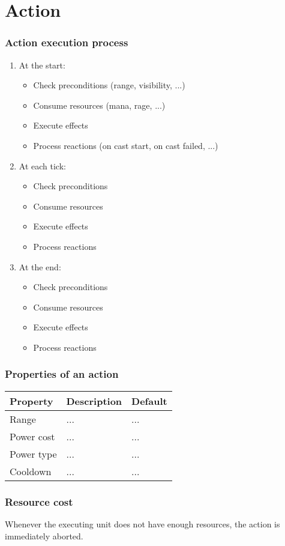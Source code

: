 \chapter{Action}

\subsection{Action execution process}

\begin{enumerate}
	\item At the start:
	\begin{itemize}
		\item Check preconditions (range, visibility, ...)
		\item Consume resources (mana, rage, ...)
		\item Execute effects
		\item Process reactions (on cast start, on cast failed, ...)
    	\end{itemize}
	\item  At each tick:
	\begin{itemize}
		\item Check preconditions
		\item Consume resources
		\item Execute effects
		\item Process reactions 
    	\end{itemize}
	\item At the end:
	\begin{itemize}
		\item Check preconditions
		\item Consume resources
		\item Execute effects
		\item Process reactions 
    	\end{itemize}
\end{enumerate}

\subsection{Properties of an action}

\begin{tabular}{p{4cm} l l}
\toprule
Property & Description & Default \\
\midrule
Range & ... & ... \\
Power cost & ... & ... \\
Power type & ... & ... \\
Cooldown & ... & ... \\
\bottomrule
\end{tabular}

\subsection{Resource cost}

Whenever the executing unit does not have enough resources, the action is immediately aborted.